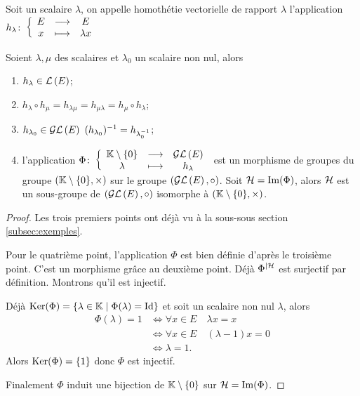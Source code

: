\begin{defdef}
  Soit un scalaire \(\lambda\), on appelle homothétie vectorielle de rapport 
  \(\lambda\) l'application \(h_\lambda\colon \left\{\begin{array}{ccc} E & \longrightarrow &E\\ x & \longmapsto & \lambda x \end{array} \right.\)
\end{defdef}

\begin{prop}
  Soient \(\lambda, \mu\) des scalaires et \(\lambda_0\) un scalaire non nul, 
  alors
  \begin{enumerate}
    \item \(h_\lambda \in \mathcal{L}\left(E\right)\);
    \item \(h_\lambda \circ h_\mu = h_{\lambda \mu} = h_{\mu \lambda} = h_\mu 
      \circ h_\lambda\);
    \item \(h_{\lambda_0} \in \GL{E} \ 
      (h_{\lambda_0})^{-1}=h_{\lambda_0^{-1}}\);
    \item l'application 
      \(\Phi\colon \left\{\begin{array}{ccc} \mathbb{K}\setminus\{0\} & \longrightarrow &\mathcal{GL}\left(E\right)\\ \lambda & \longmapsto & h_\lambda \end{array} \right.\) est un 
      morphisme de groupes du groupe \((\mathbb{K}\setminus\{0\}, \times)\) sur le 
      groupe \((\mathcal{GL}\left(E\right), \circ)\). Soit \(\mathcal{H}=\operatorname{Im}(\Phi)\), alors \(\mathcal{H}\) est un 
      sous-groupe de \((\mathcal{GL}\left(E\right), \circ)\) isomorphe à \((\mathbb{K}\setminus\{0\}, 
      \times)\).
  \end{enumerate}

\end{prop}

\begin{proof}
  Les trois premiers points ont déjà vu à la sous-sous section~
  \ref{subsec:exemples}.

  Pour le quatrième point, l'application \(\Phi\) est bien définie d'après le 
  troisième point. C'est un morphisme grâce au deuxième point. Déjà 
  \(\Phi^{|\mathcal{H}}\) est surjectif par définition. Montrons qu'il est injectif.

  Déjà \(\operatorname{Ker}(\Phi)=\left\{\lambda \in \mathbb{K}\mathrel{}\middle|\mathrel{}\Phi(\lambda)=\operatorname{Id}\right\}\) et soit un 
  scalaire non nul \(\lambda\), alors
  \begin{align}
    \Phi(\lambda) = 1 &\iff \forall x \in E \quad \lambda x=x\\
    &\iff \forall x \in E \quad (\lambda-1)x=0\\
    &\iff \lambda=1.
  \end{align}
  Alors  \(\operatorname{Ker}(\Phi)=\{1\}\) donc \(\Phi\) est injectif.

  Finalement \(\Phi\) induit une bijection de \(\mathbb{K}\setminus\{0\}\) sur 
  \(\mathcal{H}=\operatorname{Im}(\Phi)\).
\end{proof}

